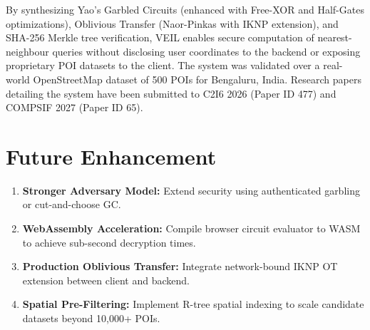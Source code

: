 \documentclass[12pt,a4paper,oneside]{report}
\begin{document}
By synthesizing Yao's Garbled Circuits (enhanced with Free-XOR and Half-Gates optimizations), Oblivious Transfer (Naor-Pinkas with IKNP extension), and SHA-256 Merkle tree verification, VEIL enables secure computation of nearest-neighbour queries without disclosing user coordinates to the backend or exposing proprietary POI datasets to the client. The system was validated over a real-world OpenStreetMap dataset of 500 POIs for Bengaluru, India. Research papers detailing the system have been submitted to C2I6 2026 (Paper ID 477) and COMPSIF 2027 (Paper ID 65).

\section{Future Enhancement}
\begin{enumerate}
    \item \textbf{Stronger Adversary Model:} Extend security using authenticated garbling or cut-and-choose GC.
    \item \textbf{WebAssembly Acceleration:} Compile browser circuit evaluator to WASM to achieve sub-second decryption times.
    \item \textbf{Production Oblivious Transfer:} Integrate network-bound IKNP OT extension between client and backend.
    \item \textbf{Spatial Pre-Filtering:} Implement R-tree spatial indexing to scale candidate datasets beyond 10,000+ POIs.
\end{enumerate}
\end{document}
